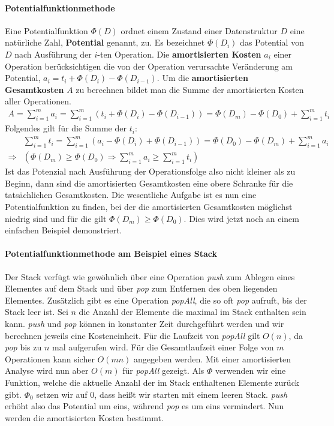 \documentclass[a4paper,12pt]{article}
\begin{document}
\paragraph{Potentialfunktionmethode} Eine Potentialfunktion $\Phi(D)$ ordnet einem Zustand einer Datenstruktur $D$ eine natürliche Zahl, \textbf{Potential} genannt, zu. Es bezeichnet $\Phi(D_i)$ das Potential von $D$ nach Ausführung der $i$-ten Operation. Die \textbf{amortisierten Kosten} $a_i$ einer Operation berücksichtigen die von der Operation verursachte Veränderung am Potential, $a_i = t_i + \Phi(D_{i}) - \Phi(D_{i-1})$. Um die \textbf{amortisierten Gesamtkosten} $A$ zu berechnen bildet man die Summe der amortisierten Kosten aller Operationen. 
\begin{align*}
A = \sum_{i = 1}^{m} a_i =  \sum_{i = 1}^{m} \left(t_i + \Phi\left(D_{i}\right) - \Phi\left(D_{i-1}\right)\right) = \Phi\left(D_{m}\right) - \Phi\left(D_{0}\right) + \sum_{i = 1}^{m} t_i 
\end{align*}
Folgendes gilt für die Summe der $t_i$:
\begin{align*}
&\sum_{i = 1}^{m} t_i =  \sum_{i = 1}^{m} \left(a_i - \Phi\left(D_{i}\right) + \Phi\left(D_{i-1}\right)\right) = \Phi\left(D_{0}\right) - \Phi\left(D_{m}\right) + \sum_{i = 1}^{m} a_i \\
\Rightarrow &\left( \Phi\left(D_{m}\right) \geq \Phi\left(D_{0}\right) \Rightarrow \sum_{i = 1}^{m} a_i \geq \sum_{i = 1}^{m} t_i \right)
\end{align*}
Ist das Potenzial nach Ausführung der Operationsfolge also nicht kleiner als zu Beginn, dann sind die amortisierten Gesamtkosten eine obere Schranke für die tatsächlichen Gesamtkosten. Die wesentliche Aufgabe ist es nun eine Potentialfunktion zu finden, bei der die amortisierten Gesamtkosten möglichst niedrig sind und für die gilt $\Phi\left(D_{m}\right) \geq \Phi\left(D_{0}\right)$. Dies wird jetzt noch an einem einfachen Beispiel demonstriert.

\paragraph{Potentialfunktionmethode am Beispiel eines Stack} 
Der Stack verfügt wie gewöhnlich über eine Operation \textit{push} zum Ablegen eines Elementes auf dem Stack und über \textit{pop} zum Entfernen des oben liegenden Elementes. Zusätzlich gibt es eine Operation \textit{popAll}, die so oft \textit{pop} aufruft, bis der Stack leer ist. Sei $n$ die Anzahl der Elemente die maximal im Stack enthalten sein kann. \textit{push} und \textit{pop} können in konstanter Zeit durchgeführt werden und wir berechnen jeweils eine Kosteneinheit. Für die Laufzeit von \textit{popAll} gilt $O(n)$, da \textit{pop} bis zu $n$ mal aufgerufen wird. Für die Gesamtlaufzeit einer Folge von $m$ Operationen kann sicher $O(mn)$ angegeben werden. Mit einer amortisierten Analyse wird nun aber $O(m)$ für \textit{popAll} gezeigt. Als $\Phi$ verwenden wir eine Funktion, welche die aktuelle Anzahl der im Stack enthaltenen Elemente zurück gibt. $\Phi_0$ setzen wir auf $0$, dass heißt wir starten mit einem leeren Stack. \textit{push} erhöht also das Potential um eins, während \textit{pop} es um eins vermindert. Nun werden die amortisierten Kosten bestimmt. 
\end{document}

